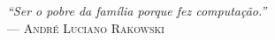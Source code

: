 \clearpage
\begin{flushright}
\mbox{}\vfill
{\sffamily\itshape
``Ser o pobre da família porque fez computação.''\\}
--- \textsc{André Luciano Rakowski}
\end{flushright}
